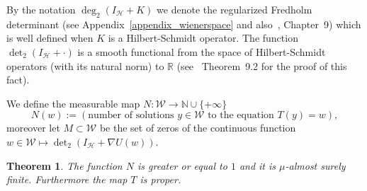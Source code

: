 \documentclass[a4paper,10pt]{article}
\newcommand{\assign}{:=}
\newtheorem{theorem}{Theorem}
\begin{document}
By the notation $\deg_2 (I_{\mathcal{H}} + K)$ we denote the regularized
Fredholm determinant (see Appendix~\ref{appendix_wienerspace} and
also~{\cite{Simon2005}}, Chapter~9) which is well defined when $K$ is a
Hilbert-Schmidt operator. The function $\det_2 (I_{\mathcal{H}} + \cdot)$ is a
smooth functional from the space of Hilbert-Schmidt operators (with its
natural norm) to $\mathbb{R}$ (see~{\cite{Simon2005}} Theorem~9.2 for the
proof of this fact).

We define the measurable map $N : \mathcal{W} \rightarrow \mathbb{N} \cup \{ +
\infty \}$
\[ N (w) \assign \left( \text{number of solutions $y \in \mathcal{W}$ to the
   equation $T (y) = w$} \right), \]
moreover let $M \subset \mathcal{W}$ be the set of zeros of the continuous
function $w \in \mathcal{W} \longmapsto \det_2 (I_{\mathcal{H}} + \nabla U
(w))$.

\begin{theorem}
  \label{theorem_weaksolution2}The function $N$ is greater or equal to $1$ and
  it is $\mu$-almost surely finite. Furthermore the map $T$ is proper.
\end{theorem}
\end{document}
